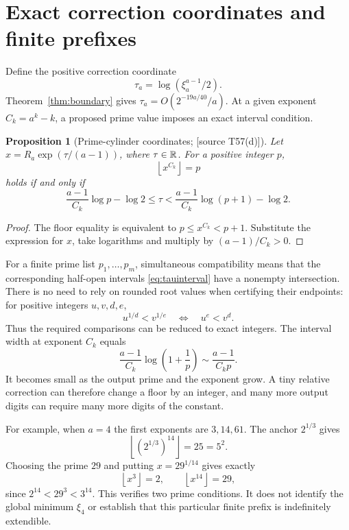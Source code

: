 \documentclass[11pt,a4paper]{article}
\newtheorem{proposition}[theorem]{Proposition}
\theoremstyle{definition}\newtheorem{definition}[theorem]{Definition}
\theoremstyle{remark}\newtheorem{remark}[theorem]{Remark}
\newcommand{\floor}[1]{\left\lfloor #1\right\rfloor}\newcommand{\ceil}[1]{\left\lceil #1\right\rceil}
\newcommand{\sourceT}[1]{\textup{[source T#1]}}
\begin{document}
\section{Exact correction coordinates and finite prefixes}
Define the positive correction coordinate
\begin{equation}\label{eq:tau}
 \tau_a=\log(\xi_a^{a-1}/2).
\end{equation}
Theorem~\ref{thm:boundary} gives
$\tau_a=O(2^{-19a/40}/a)$. At a given exponent $C_k=a^k-k$,
a proposed prime value imposes an exact interval condition.

\begin{proposition}[Prime-cylinder coordinates; \sourceT{57(d)}]
\label{prop:tau}
Let $x=R_a\exp(\tau/(a-1))$, where $\tau\in\mathbb R$. For a positive
integer $p$,
\[
 \floor{x^{C_k}}=p
\]
holds if and only if
\begin{equation}\label{eq:tauinterval}
 \frac{a-1}{C_k}\log p-\log2
 \le\tau<
 \frac{a-1}{C_k}\log(p+1)-\log2.
\end{equation}
\end{proposition}
\begin{proof}
The floor equality is equivalent to
$p\le x^{C_k}<p+1$. Substitute the expression for $x$, take
logarithms and multiply by $(a-1)/C_k>0$.
\end{proof}

For a finite prime list $p_1,\ldots,p_m$, simultaneous compatibility
means that the corresponding half-open intervals
\eqref{eq:tauinterval} have a nonempty intersection. There is no need
to rely on rounded root values when certifying their endpoints:
for positive integers $u,v,d,e$,
\[
 u^{1/d}<v^{1/e}\quad\Longleftrightarrow\quad u^e<v^d.
\]
Thus the required comparisons can be reduced to exact integers.
The interval width at exponent $C_k$ equals
\[
 \frac{a-1}{C_k}\log\left(1+\frac1p\right)
 \sim\frac{a-1}{C_kp}.
\]
It becomes small as the output prime and the exponent grow. A tiny
relative correction can therefore change a floor by an integer, and
many more output digits can require many more digits of the constant.

For example, when $a=4$ the first exponents are $3,14,61$.
The anchor $2^{1/3}$ gives
\[
 \floor{(2^{1/3})^{14}}=25=5^2.
\]
Choosing the prime $29$ and putting $x=29^{1/14}$ gives exactly
\[
 \floor{x^3}=2,\qquad\floor{x^{14}}=29,
\]
since $2^{14}<29^3<3^{14}$. This verifies two prime conditions.
It does not identify the global minimum $\xi_4$ or establish that
this particular finite prefix is indefinitely extendible.
\end{document}
